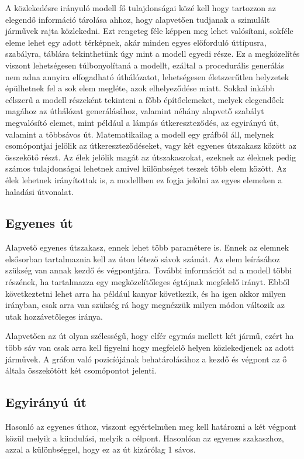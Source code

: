 ﻿

A közlekedésre irányuló modell fő tulajdonságai közé kell hogy tartozzon az elegendő információ tárolása ahhoz, hogy alapvetően tudjanak a szimulált 
járművek rajta közlekedni. Ezt rengeteg féle képpen meg lehet valósítani, sokféle eleme lehet egy adott térképnek, akár minden egyes előforduló úttípusra, 
szabályra, táblára tekinthetünk úgy mint a modell egyedi része. Ez a megközelítés viszont lehetségesen túlbonyolítaná a modellt, ezáltal a procedurális generálás
nem adna annyira elfogadható úthálózatot, lehetségesen életszerűtlen helyzetek épülhetnek fel a sok elem megléte, azok elhelyeződése miatt. Sokkal inkább célszerű a 
modell részeként tekinteni a főbb építőelemeket, melyek elegendőek magához az úthálózat generálásához, valamint néhány alapvető szabályt megvalósító elemet, mint például 
a lámpás útkereszteződés, az egyirányú út, valamint a többsávos út.
Matematikailag a modell egy gráfból áll, melynek csomópontjai jelölik az útkereszteződéseket, vagy két egyenes útszakasz között az összekötő részt. Az élek jelölik magát az útszakaszokat, ezeknek az éleknek pedig számos tulajdonságai lehetnek amivel különbséget teszek több elem között. Az élek lehetnek irányítottak is, a modellben ez fogja jelölni az egyes elemeken a haladási útvonalat.
\subsection{Egyenes út}
Alapvető egyenes útszakasz, ennek lehet több paramétere is. Ennek az elemnek elsősorban tartalmaznia kell az úton létező sávok számát.
Az elem leírásához szükség van annak kezdő és végpontjára. További információt ad a modell többi részének, ha tartalmazza egy megközelítőleges égtájnak megfelelő irányt. Ebből következtetni lehet arra ha például kanyar következik, és ha igen akkor milyen irányban, csak arra van szükség rá hogy megnézzük milyen módon változik az utak hozzávetőleges iránya.

Alapvetően az út olyan szélességű, hogy elfér egymás mellett két jármű, ezért ha több sáv van csak arra kell figyelni hogy megfelelő helyen közlekedjenek az adott járművek. A gráfon való pozicíójának behatárolásához a kezdő és végpont az ő általa összekötött két csomópontot jelenti.
\subsection{Egyirányú út}
Hasonló az egyenes úthoz, viszont egyértelműen meg kell határozni a két végpont közül melyik a kiindulási, melyik a célpont. Hasonlóan az egyenes szakaszhoz, azzal a különbséggel, hogy ez az út kizárólag 1 sávos.

